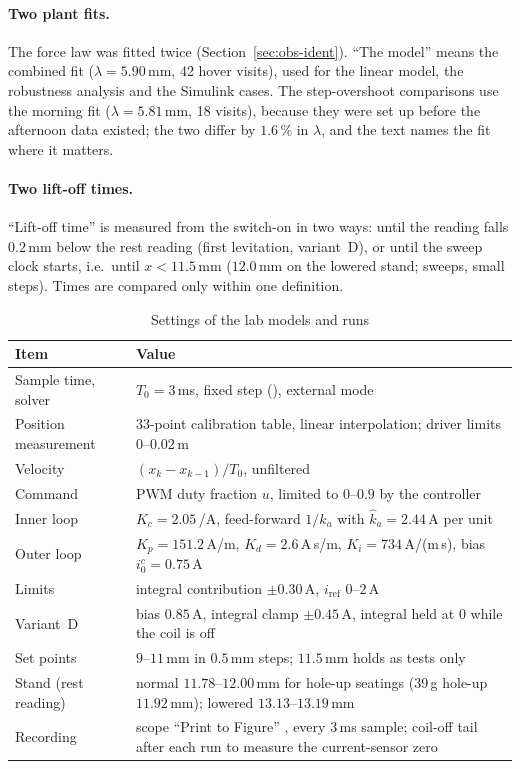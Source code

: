 \documentclass[11pt,a4paper]{article}
\newcommand{\code}[1]{\texttt{\detokenize{#1}}}
\begin{document}
\paragraph{Two plant fits.} The force law was fitted twice (Section~\ref{sec:obs-ident}). ``The model''
means the combined fit ($\lambda=5.90$\,mm, 42 hover visits), used for the linear model, the robustness analysis and the
Simulink cases. The step-overshoot comparisons use the morning fit ($\lambda=5.81$\,mm, 18 visits), because they were set up
before the afternoon data existed; the two differ by $1.6\,\%$ in $\lambda$, and the text names the fit where it matters.

\paragraph{Two lift-off times.} ``Lift-off time'' is measured from the switch-on in two ways: until the reading falls
$0.2$\,mm below the rest reading (first levitation, variant~D), or until the sweep clock starts, i.e.\ until $x<11.5$\,mm
($12.0$\,mm on the lowered stand; sweeps, small steps). Times are compared only within one definition.

\begin{table}[H]
\centering
\caption{Settings of the lab models and runs}
\label{tab:settings}
\begin{tabularx}{\linewidth}{@{}>{\raggedright\arraybackslash}p{3.8cm}X@{}}
\toprule
Item & Value \\
\midrule
Sample time, solver & $T_0=3$\,ms, fixed step (\code{ode3}), external mode \\
Position measurement & 33-point calibration table, linear interpolation; driver limits $0$--$0.02$\,m \\
Velocity & $(x_k-x_{k-1})/T_0$, unfiltered \\
Command & PWM duty fraction $u$, limited to $0$--$0.9$ by the controller \\
Inner loop & $K_c = 2.05$\,/A, feed-forward $1/\hat k_a$ with $\hat k_a = 2.44$\,A per unit \\
Outer loop & $K_p = 151.2$\,A/m, $K_d = 2.6$\,A\,s/m, $K_i = 734$\,A/(m\,s), bias $i_0^c = 0.75$\,A \\
Limits & integral contribution $\pm0.30$\,A, $i_{\mathrm{ref}}$ $0$--$2$\,A \\
Variant~D & bias $0.85$\,A, integral clamp $\pm0.45$\,A, integral held at $0$ while the coil is off \\
Set points & $9$--$11$\,mm in $0.5$\,mm steps; $11.5$\,mm holds as tests only \\
Stand (rest reading) & normal $11.78$--$12.00$\,mm for hole-up seatings (39\,g hole-up $11.92$\,mm); lowered $13.13$--$13.19$\,mm \\
Recording & scope ``Print to Figure'' \code{.fig}, every $3$\,ms sample; coil-off tail after each run to measure the current-sensor zero \\
\bottomrule
\end{tabularx}
\end{table}
\end{document}
